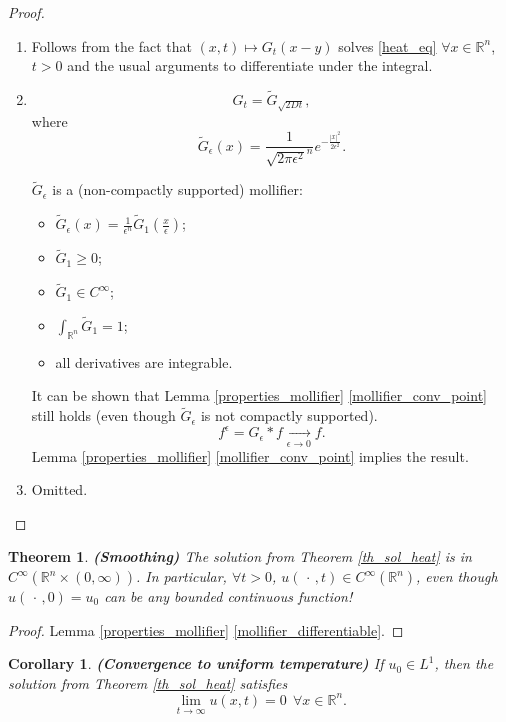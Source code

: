 \documentclass[12pt]{article}
\newtheorem{theorem}{Theorem}[section]
\newtheorem{corollary}{Corollary}[section]
\theoremstyle{definition}
\begin{document}
\begin{proof}
\begin{enumerate}[label=(\arabic*)]
\item Follows from the fact that $(x,t)\mapsto G_t(x-y)$ solves \eqref{heat_eq} $\forall x\in\mathbb R^n$, $t>0$ and the usual arguments to differentiate under the integral.

\item
\[G_t=\widetilde G_{\sqrt{2Dt}},\]
where
\[\widetilde G_\epsilon(x)=\frac1{\sqrt{2\pi\epsilon^2}^n}e^{-\frac{|x|^2}{2\epsilon^2}}.\]

$\widetilde G_\epsilon$ is a (non-compactly supported) mollifier:
\begin{itemize}
\item $\widetilde G_\epsilon(x)=\frac1{\epsilon^n}\widetilde G_1(\frac x\epsilon)$;
\item $\widetilde G_1\geq0$;
\item $\widetilde G_1\in C^\infty$;
\item $\int_{\mathbb R^n}\widetilde G_1=1$;
\item all derivatives are integrable.
\end{itemize}

It can be shown that Lemma \ref{properties_mollifier} \ref{mollifier_conv_point} still holds (even though $\widetilde G_\epsilon$ is not compactly supported).
\[f^\epsilon=G_\epsilon*f\xrightarrow[\epsilon\to0]{}f.\]
Lemma \ref{properties_mollifier} \ref{mollifier_conv_point} implies the result.

\item Omitted.
\end{enumerate}
\end{proof}

\begin{theorem}
\emph{\textbf{(Smoothing)}} The solution from Theorem \ref{th_sol_heat} is in $C^\infty(\mathbb R^n\times(0,\infty))$. In particular, $\forall t>0$, $u(\,\cdot\,,t)\in C^\infty(\mathbb R^n)$, even though $u(\,\cdot\,,0)=u_0$ can be any bounded continuous function!
\end{theorem}

\begin{proof}
Lemma \ref{properties_mollifier} \ref{mollifier_differentiable}.
\end{proof}

\begin{corollary}
\emph{\textbf{(Convergence to uniform temperature)}} If $u_0\in L^1$, then the solution from Theorem \ref{th_sol_heat} satisfies
\[\lim_{t\to\infty}u(x,t)=0\ \ \forall x\in\mathbb R^n.\]
\end{corollary}
\end{document}
